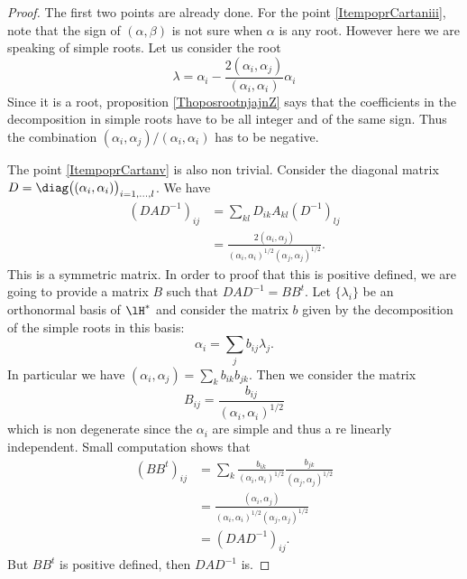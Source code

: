 \begin{proof}
    The first two points are already done. For the point \ref{ItempoprCartaniii}, note that the sign of \( (\alpha,\beta)\) is not sure when \( \alpha\) is any root. However here we are speaking of simple roots. Let us consider the root
    \begin{equation}
        \lambda=\alpha_i-\frac{ 2(\alpha_i,\alpha_j) }{ (\alpha_i,\alpha_i) }\alpha_i
    \end{equation}
    Since it is a root, proposition \ref{ThoposrootnjajnZ} says that the coefficients in the decomposition in simple roots have to be all integer and of the same sign. Thus the combination \( (\alpha_i,\alpha_j)/(\alpha_i,\alpha_i)\) has to be negative.

    The point \ref{ItempoprCartanv} is also non trivial. Consider the diagonal matrix \( D=\diag\big( (\alpha_i,\alpha_i) \big)_{i=1,\ldots,l}\). We have
    \begin{subequations}
        \begin{align}
            (DAD^{-1})_{ij}&=\sum_{kl}D_{ik}A_{kl}(D^{-1})_{lj}\\
            &=\frac{ 2(\alpha_i,\alpha_j) }{ (\alpha_i,\alpha_i)^{1/2}(\alpha_j,\alpha_j)^{1/2} }.
        \end{align}
    \end{subequations}
    This is a symmetric matrix. In order to proof that this is positive defined, we are going to provide a matrix \( B\) such that \( DAD^{-1}=BB^t\). Let \( \{ \lambda_i \}\) be an orthonormal basis of \( \lH^*\) and consider the matrix \( b\) given by the decomposition of the simple roots in this basis:
    \begin{equation}
        \alpha_i=\sum_j b_{ij}\lambda_j.
    \end{equation}
    In particular we have \( (\alpha_i,\alpha_j)=\sum_kb_{ik}b_{jk}\). Then we consider the matrix
    \begin{equation}
        B_{ij}=\frac{ b_{ij} }{ (\alpha_i,\alpha_i)^{1/2} }
    \end{equation}
    which is non degenerate since the \( \alpha_i\) are simple and thus a re linearly independent. Small computation shows that 
    \begin{subequations}
        \begin{align}
            (BB^t)_{ij}&=\sum_k\frac{ b_{ik} }{ (\alpha_i,\alpha_i)^{1/2} }\frac{ b_{jk} }{ (\alpha_j,\alpha_j)^{1/2} }\\
            &=\frac{ (\alpha_i,\alpha_j) }{ (\alpha_i,\alpha_i)^{1/2}(\alpha_j,\alpha_j)^{1/2} }\\
            &=(DAD^{-1})_{ij}.
        \end{align}
    \end{subequations}
    But \( BB^t\) is positive defined, then \( DAD^{-1}\) is.
\end{proof}



